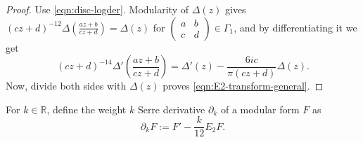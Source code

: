 \begin{proof}
Use \eqref{eqn:disc-logder}.
Modularity of $\Delta(z)$ gives $(cz + d)^{-12}\Delta(\frac{az + b}{cz + d}) = \Delta(z)$ for $\left(\begin{smallmatrix}a&b\\c&d\end{smallmatrix}\right) \in \Gamma_1$, and by differentiating it we get
\begin{equation}
    (cz + d)^{-14} \Delta'\left(\frac{az + b}{cz + d}\right) = \Delta'(z) - \frac{6ic}{\pi(cz + d)} \Delta(z).
\end{equation}
Now, divide both sides with $\Delta(z)$ proves \eqref{eqn:E2-transform-general}.
\end{proof}

\begin{definition}\label{def:serre-der}
For $k \in \mathbb{R}$, define the weight $k$ Serre derivative $\partial_{k}$ of a modular form $F$ as
\begin{equation}\label{eqn:serre-der}
    \partial_{k}F := F' - \frac{k}{12} E_2 F.
\end{equation}
\end{definition}

